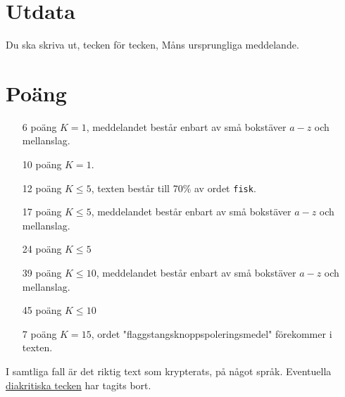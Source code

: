\section*{Utdata}
Du ska skriva ut, tecken för tecken, Måns ursprungliga meddelande.

\section*{Poäng}

\begin{enumerate}
	\item[6 poäng] $K = 1$, meddelandet består enbart av små bokstäver $a-z$ och mellanslag.
	\item[10 poäng] $K = 1$.
  \item[12 poäng] $K \le 5$, texten består till 70\% av ordet \texttt{fisk}.
	\item[17 poäng] $K \le 5$, meddelandet består enbart av små bokstäver $a-z$ och mellanslag.
  \item[24 poäng] $K \le 5$
	\item[39 poäng] $K \le 10$, meddelandet består enbart av små bokstäver $a-z$ och mellanslag.
  \item[45 poäng] $K \le 10$
	\item[7 poäng] $K = 15$, ordet "flaggstangsknoppspoleringsmedel" förekommer i texten.
\end{enumerate}

I samtliga fall är det riktig text som krypterats, på något språk. Eventuella \href{https://sv.wikipedia.org/wiki/Diakritiskt\_tecken}{diakritiska tecken} har tagits bort.
